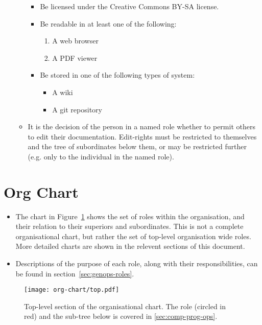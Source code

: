 \begin{itemize}
\begin{itemize}
\begin{itemize}
  \item Be licensed under the Creative Commons BY-SA license.

  \item Be readable in at least one of the following:

    \begin{enumerate}
    \item A web browser
    \item A PDF viewer
    \end{enumerate}

  \item Be stored in one of the following types of system:
    \begin{itemize}
    \item A wiki
    \item A git repository
    \end{itemize}

    \end{itemize}

  \item It is the decision of the person in a named role whether to permit others to edit their documentation.  Edit-rights must be restricted to themselves and the tree of subordinates below them, or may be restricted further (e.g. only to the individual in the named role).

  \end{itemize}

\end{itemize}

\section{Org Chart}

\begin{itemize}
\item The chart in Figure~\ref{fig:org-chart-top} shows the set of roles within the organisation, and their relation to their superiors and subordinates. This is not a complete organisational chart, but rather the set of top-level organisation wide roles. More detailed charts are shown in the relevent sections of this document.

\item Descriptions of the purpose of each role, along with their responsibilities, can be found in section~\ref{sec:genops-roles}.

\end{itemize}

\begin{figure}[h]
  \begin{center}
    \texttt{[image: org-chart/top.pdf]}
  \end{center}
  \caption{\label{fig:org-chart-top}Top-level section of the organisational chart. The  role (circled in red) and the sub-tree below is covered in \autoref{sec:comp-prog-ops}.}
\end{figure}

